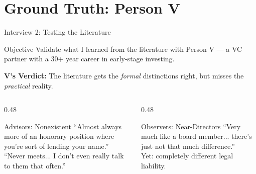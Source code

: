 \documentclass[aspectratio=169,12pt]{beamer}
\begin{document}
\section{Ground Truth: Person V}

\begin{frame}{Interview 2: Testing the Literature}
\begin{block}{Objective}
Validate what I learned from the literature with Person V --- a VC partner with a 30+ year career in early-stage investing.
\end{block}
\vspace{0.5em}
\textbf{V's Verdict:} The literature gets the \textit{formal} distinctions right, but misses the \textit{practical} reality.

\vspace{0.5em}
\begin{columns}
\begin{column}{0.48\textwidth}
\begin{alertblock}{Advisors: Nonexistent}
\small
``Almost always more of an honorary position where you're sort of lending your name.'' \\[3pt]
``Never meets... I don't even really talk to them that often.''
\end{alertblock}
\end{column}
\begin{column}{0.48\textwidth}
\begin{exampleblock}{Observers: Near-Directors}
\small
``Very much like a board member... there's just not that much difference.'' \\[3pt]
Yet: completely different legal liability.
\end{exampleblock}
\end{column}
\end{columns}
\end{frame}
\end{document}
